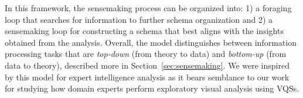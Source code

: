   \par In this framework, the sensemaking process can be organized into: 1) a foraging loop that searches for information to further schema organization and 2) a sensemaking loop for constructing a schema that best aligns with the insights obtained from the analysis. Overall, the model distinguishes between information processing tasks that are \textit{top-down} (from theory to data) and \textit{bottom-up} (from data to theory), described more in Section~\ref{sec:sensemaking}. We were inspired by this model for expert intelligence analysis as it bears semblance to our work for studying how domain experts perform exploratory visual analysis using VQSs.
